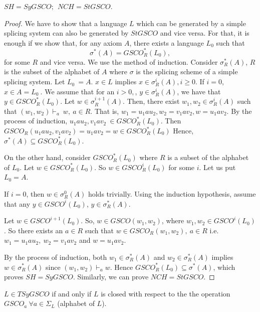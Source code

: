 \documentclass{llncs}
\newcommand{\sg}{\Sigma}
\begin{document}
\begin{theorem}
$SH = SyGSCO ;~~ NCH = StGSCO$.
\end{theorem}
\begin{proof} We have to show that a language $L$
which can be generated by a simple splicing system can also be
generated by $StGSCO$ and vice versa. For that, it is enough if we
show that, for any axiom $A$, there exists a language $L_0$ such
that
\[\sigma^*(A)=GSCO^*_R(L_0),\]
for some $R$ and vice versa.  We use  the method of induction.
Consider $ \sigma_R^*(A)$, $R$ is the subset of the alphabet of $A$
 where $ \sigma $ is the splicing scheme of a simple splicing
system.  Let $L_0~=A$. $x\in L$ implies $x \in \sigma_R^i(A),
i\geq0$.
 If $i=0$, $x\in A =L_0~.$  We assume that for an $i > 0,$, $y \in
  \sigma_R^i(A)$, we have that $y \in
GSCO_R^*(L_0)$. Let $w \in \sigma_R^{i+1}(A)$. Then, there exist
$w_1,w_2 \in \sigma_R^i(A)$ such that $(w_1, w_2)\vdash_a~ w, ~a\in
R$. That is, $w_1=u_1au_2, w_2=v_1av_2, w=u_1av_2$.
 By the process of induction, $u_1au_2, v_1av_2~\in GSCO_R^*(L_0)$. Then
  $GSCO_R(u_1au_2, v_1av_2) = u_1av_2=w \in GSCO_R^*(L_0)$
Hence, $\sigma^*(A) \subseteq GSCO^*_R(L_0)$.

  \par On the other hand, consider $GSCO_R^*(L_0)$
  where $R$ is a subset of the alphabet of $L_0$. Let $w\in GSCO_R^*(L_0)$. So $w\in
  GSCO_R^i(L_0)$ for some $i$. Let us put $L_0=A$.
\par If $i=0$, then $w\in\sigma_R^0(A)$ holds trivially. Using the
induction hypothesis, assume that any $y\in GSCO^i(L_0)$,
$y\in\sigma_R^*(A)$.
\par Let $w\in GSCO^{i+1}(L_0)$. So, $w\in GSCO(w_1,w_2)$, where
$w_1,w_ 2\in GSCO^i(L_0)$. So there exists an $a\in R$ such that
$w\in GSCO_R(w_1,w_2),~a\in R$ i.e. $w_1=u_1au_2,~w_2=v_1av_2$ and
$w=u_1av_2$.
\par By the process of induction, both $w_1\in\sigma_R^*(A)$ and $w_2\in\sigma_R^*(A)$
implies $w\in\sigma_R^*(A)$ since $(w_1,w_2)\vdash_a w$. Hence $
GSCO^*_R(L_0)  \subseteq  \sigma^*(A)$, which proves $ SH = SyGSCO$.
  Similarly, we can prove $NCH = StGSCO$.

\end{proof}
\begin{theorem}
$L\in TSyGSCO$ if and only if $L$ is closed with respect to the the
operation $GSCO_a~\forall a\in \sg_L$ (alphabet of $L$).
\end{theorem}
\end{document}
